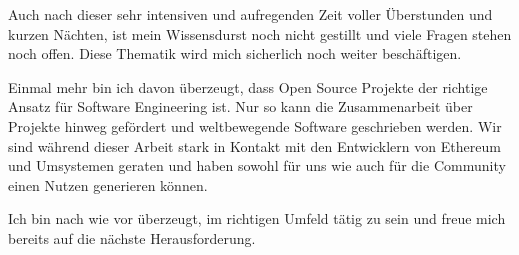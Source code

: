 Auch nach dieser sehr intensiven und aufregenden Zeit voller Überstunden und kurzen Nächten, ist mein Wissensdurst noch nicht gestillt und viele Fragen stehen noch offen. Diese Thematik wird mich sicherlich noch weiter beschäftigen.

Einmal mehr bin ich davon überzeugt, dass Open Source Projekte der richtige Ansatz für Software Engineering ist. Nur so kann die Zusammenarbeit über Projekte hinweg gefördert und weltbewegende Software geschrieben werden. Wir sind während dieser Arbeit stark in Kontakt mit den Entwicklern von Ethereum und Umsystemen geraten und haben sowohl für uns wie auch für die Community einen Nutzen generieren können.

Ich bin nach wie vor überzeugt, im richtigen Umfeld tätig zu sein und freue mich bereits auf die nächste Herausforderung. 

